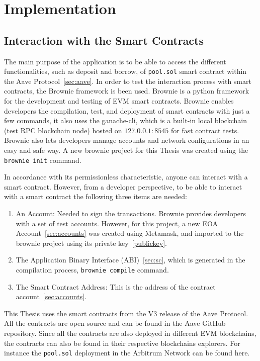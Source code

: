 \documentclass[11pt,a4paper]{report}
\begin{document}
\chapter{Implementation} \label{ch:impl}
\section{Interaction with the Smart Contracts}
The main purpose of the application is to be able to access the different functionalities, such as deposit and borrow, of \verb|pool.sol|  smart contract within the Aave Protocol~\ref{sec:aave}. In order to test the interaction process with smart contracts, the Brownie framework\cite{brow} is been used. Brownie is a python framework for the development and testing of EVM smart contracts. Brownie enables developers the compilation, test, and deployment of smart contracts with just a few commands, it also uses the ganache-cli\cite{ganache}, which is a built-in local blockchain (test RPC blockchain node) hosted on $127.0.0.1:8545$ for fast contract tests. Brownie also lets developers manage accounts and network configurations in an easy and safe way. A new brownie project for this Thesis was created using the \verb|brownie init| command.

In accordance with its permissionless characteristic, anyone can interact with a smart contract. However, from a developer perspective, to be able to interact with a smart contract the following three items are needed:
\begin{enumerate}\label{sc_interaction}
	\item An Account: Needed to sign the transactions. Brownie provides developers with a set of test accounts. However, for this project, a new EOA Account~\ref{sec:accounts} was created using Metamask\cite{wiki:MetaMask}, and imported to the brownie project using its private key~\ref{publickey}.
	\item The Application Binary Interface (ABI)~\ref{sec:sc}, which is generated in the compilation process, \verb|brownie compile| command.
	\item The Smart Contract Address: This is the address of the contract account~\ref{sec:accounts}. 
\end{enumerate}
This Thesis uses the smart contracts from the V3 release of the Aave Protocol. All the contracts are open source and can be found in the Aave GitHub repository\cite{aavegithub}. Since all the contracts are also deployed in different EVM blockchains, the contracts can also be found in their respective blockchains explorers. For instance the \verb|pool.sol| deployment in the Arbitrum Network can be found here\cite{arbiscan}.
\end{document}
